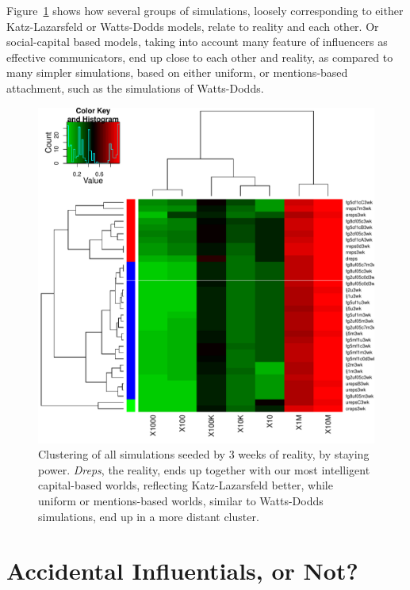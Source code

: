 \documentclass[10pt,oneside]{memoir}
\begin{document}
Figure~\ref{figure:heatmap-srates-medians-3wk} shows how several groups of simulations, loosely corresponding to either Katz-Lazarsfeld or Watts-Dodds models, relate to reality and each other.  Or social-capital based models, taking into account many feature of influencers as effective communicators, end up close to each other and reality, as compared to many simpler simulations, based on either uniform, or mentions-based attachment, such as the simulations of Watts-Dodds.



\begin{figure}
\begin{center}
    \includegraphics{figures/heatmap-srates-medians-3wk}
    \caption{Clustering of all simulations seeded by 3 weeks of reality, by staying power.  \emph{Dreps}, the reality, ends up together with our most intelligent capital-based worlds, reflecting Katz-Lazarsfeld better,  while uniform or mentions-based worlds, similar to Watts-Dodds simulations, end up in a more distant cluster.}
    \label{figure:heatmap-srates-medians-3wk}
\end{center}
\end{figure}
\pagebreak \section{Accidental Influentials, or Not?}
\label{accidentalinfluentialsornot}
\end{document}
